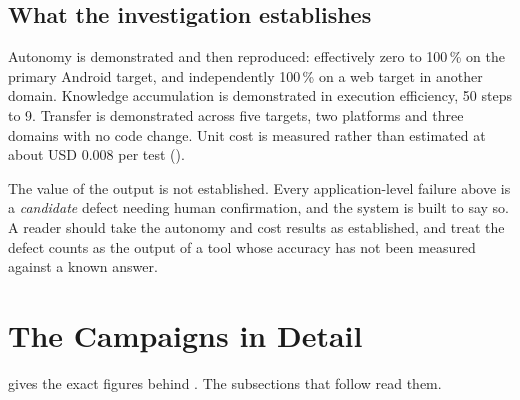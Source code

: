 \subsection{What the investigation establishes}

Autonomy is demonstrated and then reproduced: effectively zero to 100\,\% on
the primary Android target, and independently 100\,\% on a web target in
another domain. Knowledge accumulation is demonstrated in execution efficiency,
50 steps to 9. Transfer is demonstrated across five targets, two platforms and
three domains with no code change. Unit cost is measured rather than estimated
at about USD 0.008 per test ().

The value of the output is not established. Every application-level failure
above is a \emph{candidate} defect needing human confirmation, and the system
is built to say so. A reader should take the autonomy and cost results as
established, and treat the defect counts as the output of a tool whose accuracy
has not been measured against a known answer.

\section{The Campaigns in Detail}
\label{sec:campaign-detail}

 gives the exact figures behind . The
subsections that follow read them.

